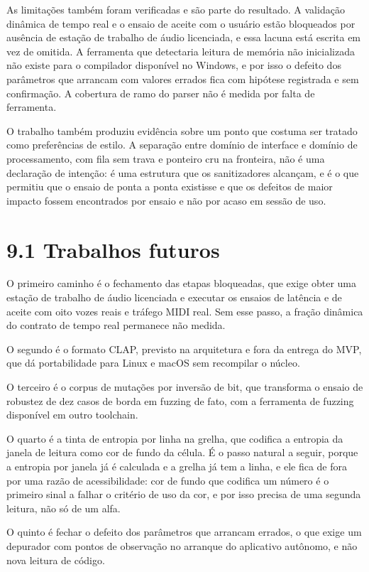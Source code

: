 \documentclass[12pt,a4paper]{article}
\begin{document}
As limitações também foram verificadas e são parte do resultado. A validação dinâmica de tempo real e o ensaio de aceite com o usuário estão bloqueados por ausência de estação de trabalho de áudio licenciada, e essa lacuna está escrita em vez de omitida. A ferramenta que detectaria leitura de memória não inicializada não existe para o compilador disponível no Windows, e por isso o defeito dos parâmetros que arrancam com valores errados fica com hipótese registrada e sem confirmação. A cobertura de ramo do parser não é medida por falta de ferramenta.


O trabalho também produziu evidência sobre um ponto que costuma ser tratado como preferências de estilo. A separação entre domínio de interface e domínio de processamento, com fila sem trava e ponteiro cru na fronteira, não é uma declaração de intenção: é uma estrutura que os sanitizadores alcançam, e é o que permitiu que o ensaio de ponta a ponta existisse e que os defeitos de maior impacto fossem encontrados por ensaio e não por acaso em sessão de uso.


\section*{9.1 Trabalhos futuros}

O primeiro caminho é o fechamento das etapas bloqueadas, que exige obter uma estação de trabalho de áudio licenciada e executar os ensaios de latência e de aceite com oito vozes reais e tráfego MIDI real. Sem esse passo, a fração dinâmica do contrato de tempo real permanece não medida.


O segundo é o formato CLAP, previsto na arquitetura e fora da entrega do MVP, que dá portabilidade para Linux e macOS sem recompilar o núcleo.


O terceiro é o corpus de mutações por inversão de bit, que transforma o ensaio de robustez de dez casos de borda em fuzzing de fato, com a ferramenta de fuzzing disponível em outro toolchain.


O quarto é a tinta de entropia por linha na grelha, que codifica a entropia da janela de leitura como cor de fundo da célula. É o passo natural a seguir, porque a entropia por janela já é calculada e a grelha já tem a linha, e ele fica de fora por uma razão de acessibilidade: cor de fundo que codifica um número é o primeiro sinal a falhar o critério de uso da cor, e por isso precisa de uma segunda leitura, não só de um alfa.


O quinto é fechar o defeito dos parâmetros que arrancam errados, o que exige um depurador com pontos de observação no arranque do aplicativo autônomo, e não nova leitura de código.
\end{document}

